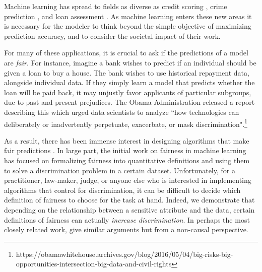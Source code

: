 Machine learning has spread to fields as diverse as credit scoring \cite{khandani2010consumer}, crime prediction \cite{brennan2009evaluating}, and loan assessment \cite{mahoney2007method}. As
machine learning enters these new areas it is necessary for the
modeler to think beyond the simple objective of maximizing prediction
accuracy, and to consider the societal impact of their work.

For many of these applications, it is crucial to
ask if the predictions of a model are
\emph{fair}. For instance, imagine a bank wishes to predict if an individual should be given
a loan to buy a house. The bank wishes to use historical repayment data, alongside  individual data. If they simply learn a model
that  predicts whether the
loan will be paid back, it may unjustly favor
applicants of particular subgroups, due to past and
present prejudices. The Obama Administration released a report
describing this which urged data scientists to
analyze ``how technologies can deliberately or inadvertently
perpetuate, exacerbate, or mask
discrimination".\footnote{https://obamawhitehouse.archives.gov/blog/2016/05/04/big-risks-big-opportunities-intersection-big-data-and-civil-rights}

As a result, there has been immense interest in designing
algorithms that make fair predictions
\cite{hardt2016equality,dwork2012fairness,joseph2016rawlsian,kamishima2011fairness,zliobaite2015survey,zafar2016fairness,zafar2015learning,grgiccase,kleinberg2016inherent,calders2010three,kamiran2012data,bolukbasi2016man,kamiran2009classifying,zemel2013learning,louizos2015variational}. 
In large part, the initial work on fairness in machine learning has
focused on formalizing fairness into quantitative definitions and using them to solve a
discrimination problem in a certain dataset. Unfortunately, for a
practitioner, law-maker, judge, or anyone else who is interested in
implementing algorithms that control for discrimination, it can be
difficult to decide which definition of fairness to choose for the
task at hand. Indeed, we demonstrate that depending on the
relationship between a sensitive attribute and the data, certain
definitions of fairness can actually \emph{increase discrimination}.
In perhaps the most closely related work, \citet{johnson2016impartial}
give similar arguments but from a non-causal perspective.


